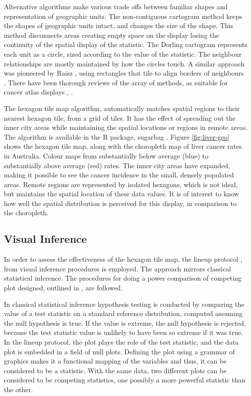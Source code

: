 \documentclass{monashthesis}
\begin{document}
Alternative algorithms make various trade offs between familiar shapes and representation of geographic units. The non-contiguous cartogram method \autocite{NAC} keeps the shapes of geographic units intact, and changes the size of the shape. This method disconnects areas creating empty space on the display losing the continuity of the spatial display of the statistic. The Dorling cartogram \autocite{ACTUC} represents each unit as a circle, sized according to the value of the statistic. The neighbour relationships are mostly maintained by how the circles touch. A similar approach was pioneered by Raisz \autocite*{RSCW}, using rectangles that tile to align borders of neighbours \autocite{CDWCS}. There have been thorough reviews of the array of methods, as suitable for cancer atlas displays \autocite{review}, \autocite{BCM}.

The hexagon tile map algorithm, automatically matches spatial regions to their nearest hexagon tile, from a grid of tiles. It has the effect of spreading out the inner city areas while maintaining the spatial locations or regions in remote areas. The algorithm is available in the R package, sugarbag \autocite{sugarbag}. Figure \ref{fig:liver-geo} shows the hexagon tile map, along with the choropleth map of liver cancer rates in Australia. Colour maps from substantially below average (blue) to substantially above average (red) rates. The inner city areas have expanded, making it possible to see the cancer incidence in the small, densely populated areas. Remote regions are represented by isolated hexagons, which is not ideal, but maintains the spatial location of these data values. It is of interest to know how well the spatial distribution is perceived for this display, in comparison to the choropleth.

\hypertarget{visual-inference}{%
\subsection{Visual Inference}\label{visual-inference}}

In order to assess the effectiveness of the hexagon tile map, the lineup protocol \autocite{GIIV},\autocite{BCHLLSW09} from visual inference procedures is employed. The approach mirrors classical statistical inference. The procedures for doing a power comparison of competing plot designed, outlined in \textcite{GTPCCD}, are followed.

In classical statistical inference hypothesis testing is conducted by comparing the value of a test statistic on a standard reference distribution, computed assuming the null hypothesis is true. If the value is extreme, the null hypothesis is rejected, because the test statistic value is unlikely to have been so extreme if it was true. In the lineup protocol, the plot plays the role of the test statistic, and the data plot is embedded in a field of null plots. Defining the plot using a grammar of graphics \autocite{ggplot2} makes it a functional mapping of the variables and thus, it can be considered to be a statistic. With the same data, two different plots can be considered to be competing statistics, one possibly a more powerful statistic than the other.
\end{document}
